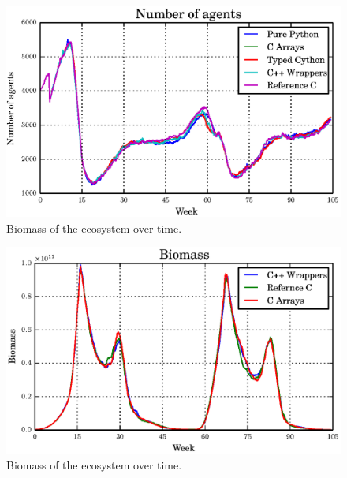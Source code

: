 \documentclass[12pt, a4paper]{report}
\begin{document}
\begin{appendices}
\begin{figure}[H]
  \begin{center}
    \includegraphics[width=\columnwidth]{graphs/ag-fixed-single-double-comp.eps}
    \caption{Biomass of the ecosystem over time.}
    \label{fig:master-bio}
  \end{center}
\end{figure}

\begin{figure}[H]
  \begin{center}
    \includegraphics[width=\columnwidth]{graphs/bio-fixed-multi-double-comp.eps}
    \caption{Biomass of the ecosystem over time.}
    \label{fig:master-bio}
  \end{center}
\end{figure}


\end{appendices}
\end{document}
